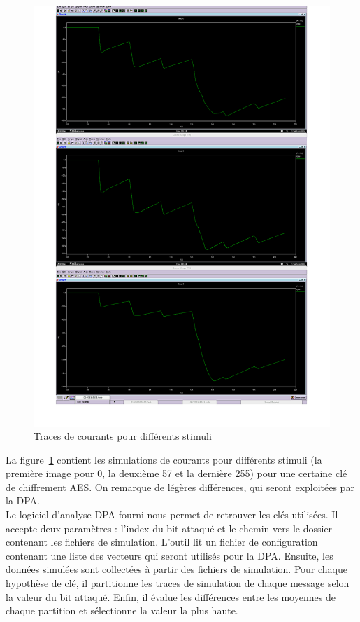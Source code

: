\begin{figure}[h!]
    \centering
    \includegraphics[width=\textwidth]{data/courantsImage}
    \caption{Traces de courants pour différents stimuli}
    \label{fig:courants}
\end{figure}

La figure~\ref{fig:courants} contient les simulations de courants pour 
différents stimuli
(la première image pour 0, la deuxième 57 et la dernière 255) pour une certaine
clé de chiffrement AES. On remarque de légères différences, qui seront
exploitées par la DPA.\\

Le logiciel d'analyse DPA fourni nous permet de retrouver les clés utilisées.
Il accepte deux paramètres : l'index du bit attaqué et le chemin vers le
dossier contenant les fichiers de simulation.
L'outil lit un fichier de configuration contenant une liste des vecteurs qui
seront utilisés pour la DPA. Ensuite, les données simulées sont collectées à 
partir des fichiers de simulation. Pour chaque hypothèse de clé, il partitionne
les traces de simulation de chaque message selon la valeur du bit attaqué.
Enfin, il évalue les différences entre les moyennes de chaque partition et 
sélectionne la valeur la plus haute.


